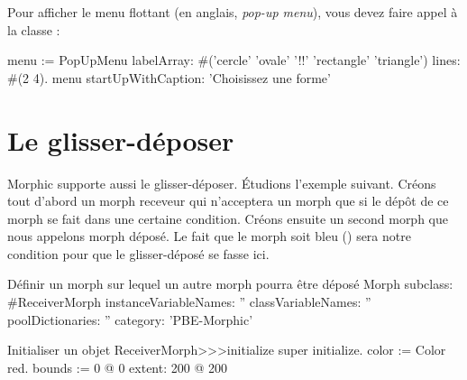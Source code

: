 \documentclass[a4paper,10pt,twoside]{book}
\begin{document}

Pour afficher le menu flottant (en anglais, \emph{pop-up menu}), vous
devez faire appel à la classe :
\begin{code}{}
menu := PopUpMenu
	labelArray: #('cercle' 'ovale' '!!' 'rectangle' 'triangle')
	lines: #(2 4).
menu startUpWithCaption: 'Choisissez une forme'
\end{code}


\section{Le glisser-déposer}

Morphic supporte aussi le glisser-déposer. Étudions l'exemple
suivant. Créons tout d'abord un morph receveur qui n'acceptera un
morph que si le dépôt de ce morph se fait dans une certaine
condition. Créons ensuite un second morph que nous appelons morph
déposé. Le fait que le morph soit bleu () sera
notre condition pour que le glisser-déposé se fasse ici.

\begin{classdef}{Définir un morph sur lequel un autre morph pourra être déposé}
Morph subclass: #ReceiverMorph
	instanceVariableNames: ''
	classVariableNames: ''
	poolDictionaries: ''
	category: 'PBE-Morphic'
\end{classdef}

\begin{method}{Initialiser un objet }
ReceiverMorph>>>initialize
	super initialize.
	color := Color red.
	bounds := 0 @ 0 extent: 200 @ 200
\end{method}
\end{document}
